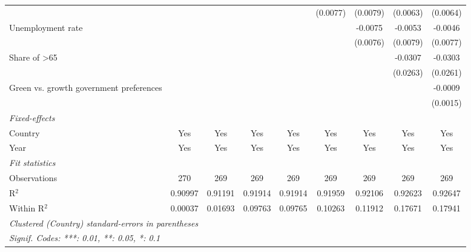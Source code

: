 \begin{table}[htbp]
\begin{tabular}{lcccccccc}
                                                      &          &          &                 &                 & (0.0077)        & (0.0079)        & (0.0063)        & (0.0064)\\   
      Unemployment rate                               &          &          &                 &                 &                 & -0.0075         & -0.0053         & -0.0046\\   
                                                      &          &          &                 &                 &                 & (0.0076)        & (0.0079)        & (0.0077)\\   
      Share of >65                                    &          &          &                 &                 &                 &                 & -0.0307         & -0.0303\\   
                                                      &          &          &                 &                 &                 &                 & (0.0263)        & (0.0261)\\   
      Green vs. growth government preferences         &          &          &                 &                 &                 &                 &                 & -0.0009\\   
                                                      &          &          &                 &                 &                 &                 &                 & (0.0015)\\   
      \midrule
      \emph{Fixed-effects}\\
      Country                                         & Yes      & Yes      & Yes             & Yes             & Yes             & Yes             & Yes             & Yes\\  
      Year                                            & Yes      & Yes      & Yes             & Yes             & Yes             & Yes             & Yes             & Yes\\  
      \midrule
      \emph{Fit statistics}\\
      Observations                                    & 270      & 269      & 269             & 269             & 269             & 269             & 269             & 269\\  
      R$^2$                                           & 0.90997  & 0.91191  & 0.91914         & 0.91914         & 0.91959         & 0.92106         & 0.92623         & 0.92647\\  
      Within R$^2$                                    & 0.00037  & 0.01693  & 0.09763         & 0.09765         & 0.10263         & 0.11912         & 0.17671         & 0.17941\\  
      \midrule \midrule
      \multicolumn{9}{l}{\emph{Clustered (Country) standard-errors in parentheses}}\\
      \multicolumn{9}{l}{\emph{Signif. Codes: ***: 0.01, **: 0.05, *: 0.1}}\\
   \end{tabular}
\end{table}


